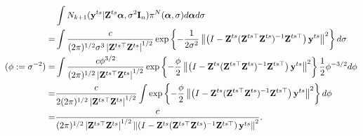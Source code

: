 \documentclass[11pt]{article}
\newcommand{\By}{\mathbf{y}}    \newcommand{\Bz}{\mathbf{z}}
\newcommand{\bfsym}[1]{\ensuremath{\boldsymbol{#1}}}
\def\balpha{\bfsym \alpha}
\theoremstyle{plain}
\theoremstyle{definition}
\theoremstyle{remark}
\begin{document}
\begin{equation*}
    \begin{split}
    &\int N_{k+1} (\By^{ts} | \BZ^{ts} \balpha, \sigma^2 \BI_n) \pi^N (\balpha, \sigma) d\balpha d \sigma
    \\
    =&
    \int
    \frac{c}{(2\pi)^{1/2} \sigma^3 \left| \BZ^{ts\top} \BZ^{ts} \right|^{1/2} } \exp\left\{-\frac{1}{2\sigma^2} \left\|\left(I-\BZ^{ts} (\BZ^{ts\top} \BZ^{ts})^{-1}\BZ^{ts\top}\right)\By^{ts}\right\|^2\right\}
     d \sigma
     \\
     (\phi:=\sigma^{-2})=&
    \int
    \frac{c \phi^{3/2}}{(2\pi)^{1/2} \left| \BZ^{ts\top} \BZ^{ts} \right|^{1/2} } \exp\left\{-\frac{\phi}{2} \left\|\left(I-\BZ^{ts} (\BZ^{ts\top} \BZ^{ts})^{-1}\BZ^{ts\top}\right)\By^{ts}\right\|^2\right\}
    \frac{1}{2} \phi^{-3/2} d \phi
     \\
     =&
    \frac{c }{2(2\pi)^{1/2} \left| \BZ^{ts\top} \BZ^{ts} \right|^{1/2} }
    \int
    \exp\left\{-\frac{\phi}{2} \left\|\left(I-\BZ^{ts} (\BZ^{ts\top} \BZ^{ts})^{-1}\BZ^{ts\top}\right)\By^{ts}\right\|^2\right\}
      d \phi
      \\
     =&
    \frac{c }{(2\pi)^{1/2} \left| \BZ^{ts\top} \BZ^{ts} \right|^{1/2} 
     \left\|\left(I-\BZ^{ts} (\BZ^{ts\top} \BZ^{ts})^{-1}\BZ^{ts\top}\right)\By^{ts}\right\|^2
 }.
    \end{split}
\end{equation*}
\end{document}

